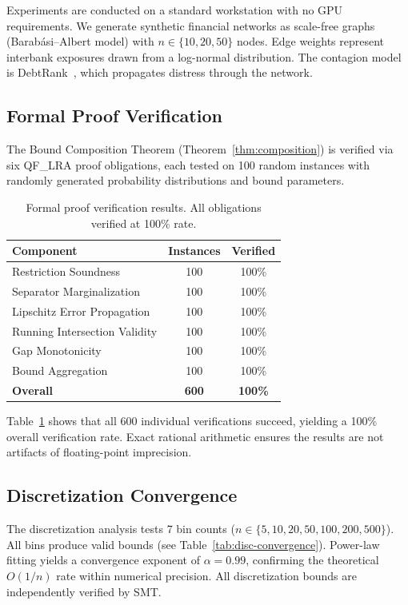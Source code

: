 \documentclass[11pt,a4paper]{article}
\begin{document}
Experiments are conducted on a standard workstation with no GPU requirements. We generate synthetic financial networks as scale-free graphs (Barab\'asi--Albert model) with $n \in \{10, 20, 50\}$ nodes. Edge weights represent interbank exposures drawn from a log-normal distribution. The contagion model is DebtRank~\citep{battiston2012debtrank}, which propagates distress through the network.

\subsection{Formal Proof Verification}
\label{sec:exp-formal}

The Bound Composition Theorem (Theorem~\ref{thm:composition}) is verified via six QF\_LRA proof obligations, each tested on 100 random instances with randomly generated probability distributions and bound parameters.

\begin{table}[t]
\centering
\caption{Formal proof verification results. All obligations verified at 100\% rate.}
\label{tab:formal-proof}
\begin{tabular}{@{}lcc@{}}
\toprule
\textbf{Component} & \textbf{Instances} & \textbf{Verified} \\
\midrule
Restriction Soundness & 100 & 100\% \\
Separator Marginalization & 100 & 100\% \\
Lipschitz Error Propagation & 100 & 100\% \\
Running Intersection Validity & 100 & 100\% \\
Gap Monotonicity & 100 & 100\% \\
Bound Aggregation & 100 & 100\% \\
\midrule
\textbf{Overall} & \textbf{600} & \textbf{100\%} \\
\bottomrule
\end{tabular}
\end{table}

Table~\ref{tab:formal-proof} shows that all 600 individual verifications succeed, yielding a 100\% overall verification rate. Exact rational arithmetic ensures the results are not artifacts of floating-point imprecision.

\subsection{Discretization Convergence}
\label{sec:exp-disc}

The discretization analysis tests 7 bin counts ($n \in \{5, 10, 20, 50, 100, 200, 500\}$). All bins produce valid bounds (see Table~\ref{tab:disc-convergence}). Power-law fitting yields a convergence exponent of $\alpha = 0.99$, confirming the theoretical $O(1/n)$ rate within numerical precision. All discretization bounds are independently verified by SMT.
\end{document}

